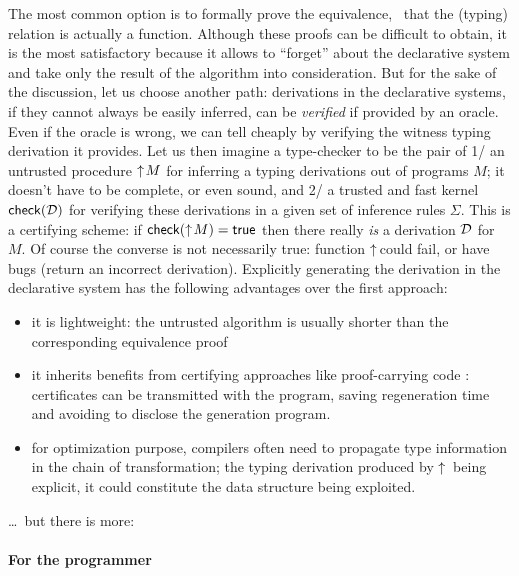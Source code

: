 \documentclass[9pt]{sigplanconf}
\begin{document}
The most common option is to formally prove the equivalence, \ie\ that
the (typing) relation is actually a function. Although these proofs
can be difficult to obtain, it is the most satisfactory because it
allows to ``forget'' about the declarative system and take only the
result of the algorithm into consideration. But for the sake of the
discussion, let us choose another path: derivations in the declarative
systems, if they cannot always be easily inferred, can be
\emph{verified} if provided by an oracle. Even if the oracle is wrong,
we can tell cheaply by verifying the witness typing derivation it
provides. Let us then imagine a type-checker to be the pair of 1/ an
untrusted procedure $\uparrow\!{M}$ for inferring a typing derivations out
of programs $M$; it doesn't have to be complete, or even sound, and 2/
a trusted and fast kernel ${\text{\textsf{check}}}({\mathcal D})$ for verifying these
derivations in a given set of inference rules $\Sigma$. This is a
certifying scheme: if ${\text{\textsf{check}}}({\uparrow\!{M}}) = \text{\textsf{true}}$ then there
really \emph{is} a derivation $\mathcal D$ for $M$. Of course the converse is
not necessarily true: function $\uparrow\!{}\!\!$ could fail, or have
bugs (return an incorrect derivation). Explicitly generating the
derivation in the declarative system has the following advantages over
the first approach:
\begin{itemize}
\item it is lightweight: the untrusted algorithm is usually shorter
  than the corresponding equivalence proof
\item it inherits benefits from certifying approaches like
  proof-carrying code \cite{necula1997proof}: certificates can be
  transmitted with the program, saving regeneration time and avoiding
  to disclose the generation program.
\item for optimization purpose, compilers often need to propagate type
  information in the chain of transformation; the typing derivation
  produced by $\uparrow\!{}$ being explicit, it could constitute the data
  structure being exploited.
\end{itemize}
\ldots\ but there is more:

\paragraph{For the programmer}
\end{document}
